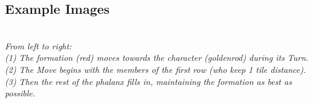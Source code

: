 \subsection*{Example Images}
\begin{center}
\\
\emph{From left to right:\\
(1) The formation (red) moves towards the character (goldenrod) during its Turn.\\
(2) The Move begins with the members of the first row (who keep 1 tile distance).\\
(3) Then the rest of the phalanx fills in, maintaining the formation as best as possible.}\\
\ \\

\end{center}
